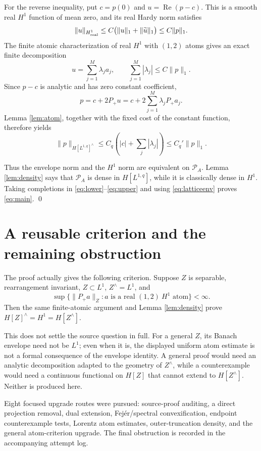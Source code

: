 \documentclass[11pt]{article}
\newcommand{\PA}{\mathcal P_A}
\begin{document}
For the reverse inequality, put $c=p(0)$ and
$u=\operatorname{Re}(p-c)$.  This is a smooth real $H^1$ function of mean
zero, and its real Hardy norm satisfies
\[
 \|u\|_{H^1_{\rm real}}
 \le C\bigl(\|u\|_1+\|\widetilde u\|_1\bigr)
 \le C\|p\|_1.
\]
The finite atomic characterization of real $H^1$ with $(1,2)$ atoms gives
an exact finite decomposition
\[
 u=\sum_{j=1}^M\lambda_j a_j,
 \qquad \sum_{j=1}^M|\lambda_j|\le C\|p\|_1.
\]
Since $p-c$ is analytic and has zero constant coefficient,
\[
 p=c+2P_+u=c+2\sum_{j=1}^M\lambda_jP_+a_j.
\]
Lemma \ref{lem:atom}, together with the fixed cost of the constant function,
therefore yields
\begin{equation}\label{eq:upper}
 \|p\|_{H[L^{1,q}]^{\wedge}}
 \le C_q\left(|c|+\sum_j|\lambda_j|\right)
 \le C_q'\|p\|_1.
\end{equation}

Thus the envelope norm and the $H^1$ norm are equivalent on $\PA$.
Lemma \ref{lem:density} says that $\PA$ is dense in $H[L^{1,q}]$, while
it is classically dense in $H^1$.  Taking completions in
\eqref{eq:lower}--\eqref{eq:upper} and using \eqref{eq:latticeenv} proves
\eqref{eq:main}. \qed

\section*{A reusable criterion and the remaining obstruction}

The proof actually gives the following criterion.  Suppose $Z$ is
separable, rearrangement invariant, $Z\subset L^1$, $Z^{\wedge}=L^1$, and
\[
 \sup\{\|P_+a\|_Z:a\text{ is a real }(1,2)\ H^1\text{ atom}\}<\infty.
\]
Then the same finite-atomic argument and Lemma \ref{lem:density} prove
$H[Z]^{\wedge}=H^1=H[Z^{\wedge}]$.

This does not settle the source question in full.  For a general $Z$, its
Banach envelope need not be $L^1$; even when it is, the displayed uniform
atom estimate is not a formal consequence of the envelope identity.  A
general proof would need an analytic decomposition adapted to the geometry
of $Z^{\wedge}$, while a counterexample would need a continuous functional
on $H[Z]$ that cannot extend to $H[Z^{\wedge}]$.  Neither is produced here.

Eight focused upgrade routes were pursued: source-proof auditing, a direct
projection removal, dual extension, Fej\'er/spectral convexification,
endpoint counterexample tests, Lorentz atom estimates, outer-truncation
density, and the general atom-criterion upgrade.  The final obstruction is
recorded in the accompanying attempt log.
\end{document}

